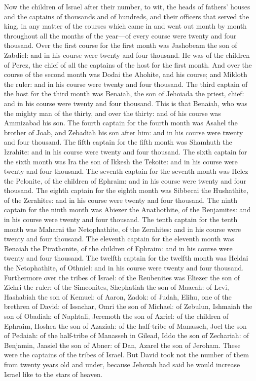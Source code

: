 Now the children of Israel after their number, to wit, the heads of fathers’ houses and the captains of thousands and of hundreds, and their officers that served the king, in any matter of the courses which came in and went out month by month throughout all the months of the year—of every course were twenty and four thousand. Over the first course for the first month was Jashobeam the son of Zabdiel: and in his course were twenty and four thousand. He was of the children of Perez, the chief of all the captains of the host for the first month. And over the course of the second month was Dodai the Ahohite, and his course; and Mikloth the ruler: and in his course were twenty and four thousand. The third captain of the host for the third month was Benaiah, the son of Jehoiada the priest, chief: and in his course were twenty and four thousand. This is that Benaiah, who was the mighty man of the thirty, and over the thirty: and of his course was Ammizabad his son. The fourth captain for the fourth month was Asahel the brother of Joab, and Zebadiah his son after him: and in his course were twenty and four thousand. The fifth captain for the fifth month was Shamhuth the Izrahite: and in his course were twenty and four thousand. The sixth captain for the sixth month was Ira the son of Ikkesh the Tekoite: and in his course were twenty and four thousand. The seventh captain for the seventh month was Helez the Pelonite, of the children of Ephraim: and in his course were twenty and four thousand. The eighth captain for the eighth month was Sibbecai the Hushathite, of the Zerahites: and in his course were twenty and four thousand. The ninth captain for the ninth month was Abiezer the Anathothite, of the Benjamites: and in his course were twenty and four thousand. The tenth captain for the tenth month was Maharai the Netophathite, of the Zerahites: and in his course were twenty and four thousand. The eleventh captain for the eleventh month was Benaiah the Pirathonite, of the children of Ephraim: and in his course were twenty and four thousand. The twelfth captain for the twelfth month was Heldai the Netophathite, of Othniel: and in his course were twenty and four thousand.  Furthermore over the tribes of Israel: of the Reubenites was Eliezer the son of Zichri the ruler: of the Simeonites, Shephatiah the son of Maacah: of Levi, Hashabiah the son of Kemuel: of Aaron, Zadok: of Judah, Elihu, one of the brethren of David: of Issachar, Omri the son of Michael: of Zebulun, Ishmaiah the son of Obadiah: of Naphtali, Jeremoth the son of Azriel: of the children of Ephraim, Hoshea the son of Azaziah: of the half-tribe of Manasseh, Joel the son of Pedaiah: of the half-tribe of Manasseh in Gilead, Iddo the son of Zechariah: of Benjamin, Jaasiel the son of Abner: of Dan, Azarel the son of Jeroham. These were the captains of the tribes of Israel. But David took not the number of them from twenty years old and under, because Jehovah had said he would increase Israel like to the stars of heaven. 